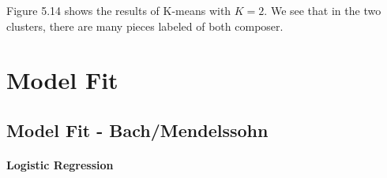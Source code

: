 \documentclass[12pt,twoside]{reedthesis}
\theoremstyle{definition}
\theoremstyle{definition}
\theoremstyle{definition}
\theoremstyle{remark}
\begin{document}
Figure 5.14 shows the results of K-means with \(K = 2\). We see that in
the two clusters, there are many pieces labeled of both composer.

\chapter{Model Fit}\label{model-fit}

\section{Model Fit -
Bach/Mendelssohn}\label{model-fit---bachmendelssohn}

\subsubsection{Logistic Regression}\label{logistic-regression-1}
\end{document}
